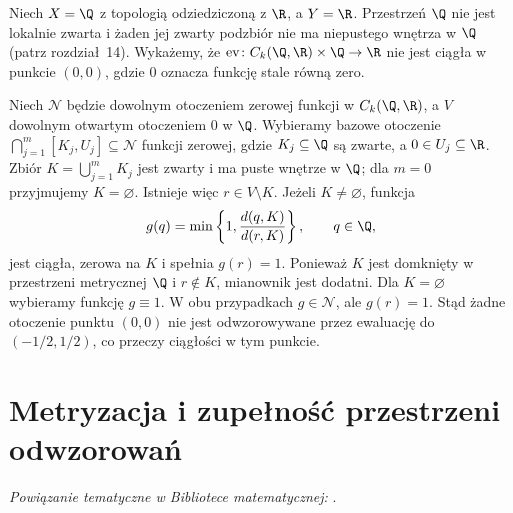 \begin{przyklad}
\label{ex:topog-odwzorowania-ewaluacja-q}
Niech $X=\Q$ z topologią odziedziczoną
z $\R$, a $Y=\R$. Przestrzeń $\Q$
nie jest lokalnie zwarta i żaden
jej zwarty podzbiór nie ma
niepustego wnętrza w $\Q$
(patrz rozdział~14).
Wykażemy, że
$\operatorname{ev}\colon C_k(\Q,\R)
\times\Q\to\R$
nie jest ciągła w punkcie
$(0,0)$, gdzie $0$ oznacza
funkcję stale równą zero.

Niech $\mathcal N$ będzie dowolnym
otoczeniem zerowej funkcji w $C_k(\Q,\R)$,
a $V$ dowolnym otwartym otoczeniem
$0$ w $\Q$. Wybieramy bazowe
otoczenie
$\bigcap_{j=1}^m[K_j,U_j]
\subseteq\mathcal N$ funkcji zerowej,
gdzie $K_j\subseteq\Q$ są zwarte,
a $0\in U_j\subseteq\R$.
Zbiór $K=\bigcup_{j=1}^mK_j$
jest zwarty i ma puste wnętrze
w $\Q$; dla $m=0$ przyjmujemy
$K=\varnothing$. Istnieje więc
$r\in V\setminus K$.
Jeżeli $K\ne\varnothing$, funkcja
\[
g(q)=\min\left\{1,
 \frac{d(q,K)}{d(r,K)}\right\},
 \qquad q\in\Q,
\]
jest ciągła, zerowa na $K$
i spełnia $g(r)=1$.
Ponieważ $K$ jest domknięty
w przestrzeni metrycznej $\Q$
i $r\notin K$, mianownik jest dodatni.
Dla $K=\varnothing$ wybieramy
funkcję $g\equiv1$.
W obu przypadkach $g\in\mathcal N$,
ale $g(r)=1$. Stąd żadne
otoczenie punktu $(0,0)$ nie jest
odwzorowywane przez ewaluację
do $(-1/2,1/2)$, co przeczy
ciągłości w tym punkcie.
\end{przyklad}

\section{Metryzacja i zupełność przestrzeni odwzorowań}
\label{sec:topog-odwzorowania-metryzacja}

\noindent\emph{Powiązanie tematyczne w Bibliotece matematycznej:} .


